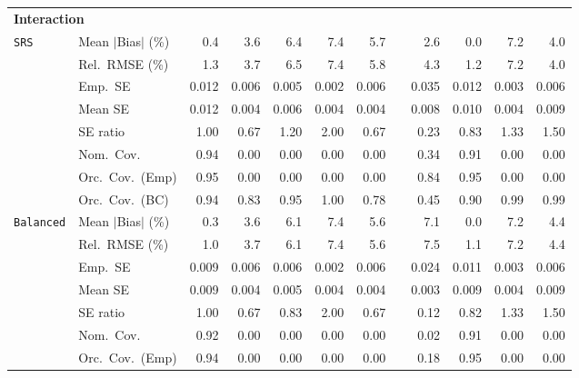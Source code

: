 \begin{landscape}
\begin{longtable}{llrrrrrrrrrr}
\multicolumn{12}{l}{\textbf{Interaction}} \\
\addlinespace[2pt]
\quad \texttt{SRS} & Mean $|$Bias$|$ (\%) & \cellcolor{ranktwo}0.4 & 3.6 & 6.4 & 7.4 & 5.7 &  & \cellcolor{rankthree}2.6 & \cellcolor{rankone}0.0 & 7.2 & 4.0 \\
 & Rel.\ RMSE (\%) & \cellcolor{ranktwo}1.3 & \cellcolor{rankthree}3.7 & 6.5 & 7.4 & 5.8 &  & 4.3 & \cellcolor{rankone}1.2 & 7.2 & 4.0 \\
 & Emp.\ SE & 0.012 & 0.006 & 0.005 & 0.002 & 0.006 &  & 0.035 & 0.012 & 0.003 & 0.006 \\
 & Mean SE & 0.012 & 0.004 & 0.006 & 0.004 & 0.004 &  & 0.008 & 0.010 & 0.004 & 0.009 \\
 & SE ratio & \cellcolor{rankone}1.00 & 0.67 & \cellcolor{rankthree}1.20 & 2.00 & 0.67 &  & 0.23 & \cellcolor{ranktwo}0.83 & 1.33 & 1.50 \\
 & Nom.\ Cov. & \cellcolor{rankone}0.94 & 0.00 & 0.00 & 0.00 & 0.00 &  & \cellcolor{rankthree}0.34 & \cellcolor{ranktwo}0.91 & 0.00 & 0.00 \\
 & Orc.\ Cov.\ (Emp) & \cellcolor{ranktwo}0.95 & 0.00 & 0.00 & 0.00 & 0.00 &  & \cellcolor{rankthree}0.84 & \cellcolor{rankone}0.95 & 0.00 & 0.00 \\
 & Orc.\ Cov.\ (BC) & \cellcolor{ranktwo}0.94 & 0.83 & \cellcolor{rankone}0.95 & 1.00 & 0.78 &  & 0.45 & 0.90 & \cellcolor{rankthree}0.99 & 0.99 \\
\addlinespace[2pt]
\quad \texttt{Balanced} & Mean $|$Bias$|$ (\%) & \cellcolor{ranktwo}0.3 & \cellcolor{rankthree}3.6 & 6.1 & 7.4 & 5.6 &  & 7.1 & \cellcolor{rankone}0.0 & 7.2 & 4.4 \\
 & Rel.\ RMSE (\%) & \cellcolor{rankone}1.0 & \cellcolor{rankthree}3.7 & 6.1 & 7.4 & 5.6 &  & 7.5 & \cellcolor{ranktwo}1.1 & 7.2 & 4.4 \\
 & Emp.\ SE & 0.009 & 0.006 & 0.006 & 0.002 & 0.006 &  & 0.024 & 0.011 & 0.003 & 0.006 \\
 & Mean SE & 0.009 & 0.004 & 0.005 & 0.004 & 0.004 &  & 0.003 & 0.009 & 0.004 & 0.009 \\
 & SE ratio & \cellcolor{rankone}1.00 & 0.67 & \cellcolor{ranktwo}0.83 & 2.00 & 0.67 &  & 0.12 & \cellcolor{rankthree}0.82 & 1.33 & 1.50 \\
 & Nom.\ Cov. & \cellcolor{rankone}0.92 & 0.00 & 0.00 & 0.00 & 0.00 &  & \cellcolor{rankthree}0.02 & \cellcolor{ranktwo}0.91 & 0.00 & 0.00 \\
 & Orc.\ Cov.\ (Emp) & \cellcolor{ranktwo}0.94 & 0.00 & 0.00 & 0.00 & 0.00 &  & \cellcolor{rankthree}0.18 & \cellcolor{rankone}0.95 & 0.00 & 0.00 \\

\end{longtable}
\end{landscape}
